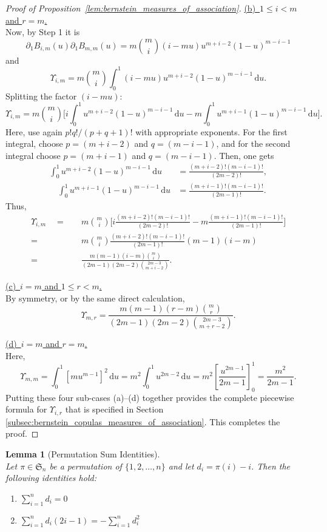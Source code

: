 \documentclass{article}
\newtheorem{lemma}[thm]{Lemma}
\theoremstyle{definition}
\newcommand{\de}{\mathrm{\,d}}
\begin{document}
\begin{proof}[Proof of Proposition~\ref{lem:bernstein_measures_of_association}]
\noindent
\underline{(b)~$1 \le i < m$ and $r = m$.}\\
Now, by Step 1 it is
\[
\partial_1 B_{i,m}(u)\partial_1 B_{m,m}(u)
=m\binom{m}{i}  (i - mu)  u^{m + i -2}  (1-u)^{m-i-1}
\]
and
\[
\Upsilon_{i,m}
=m\binom{m}{i}\int_0^1  \left(i - mu\right)  u^{m + i - 2}  (1-u)^{m-i-1}\de u.
\]
Splitting the factor $(i - mu)$:
\[
\Upsilon_{i,m}
= m\binom{m}{i} \biggl[
  i  \int_0^1    u^{m + i - 2}(1-u)^{m-i-1}  \de u 
  -  m  \int_0^1    u^{m + i - 1}(1-u)^{m-i-1}  \de u
\biggr].
\]
Here, use again $p!q!/(p+q+1)!$ with appropriate exponents.
For the first integral, choose $p = (m + i - 2)$ and $q = (m-i-1)$,  and for the second integral choose $p = (m + i - 1)$ and $q = (m-i-1)$.
Then, one gets
\begin{align*}
    \int_0^1  u^{m + i - 2}(1-u)^{m-i-1}\de u
    &=\frac{(m + i - 2)!(m - i - 1)!}{(2m-2)!}, \\
    \quad\int_0^1  u^{m + i - 1}(1-u)^{m-i-1}\de u
    &=\frac{(m + i - 1)!(m - i - 1)!}{(2m-1)!}.
\end{align*}
Thus,
\begin{align*}
    \Upsilon_{i,m}
    \quad = \quad &m\binom{m}{i}\biggl[  i\frac{(m + i - 2)!(m - i - 1)!}{(2m-2)!} -  m\frac{(m + i - 1)!(m - i - 1)!}{(2m-1)!}\biggr] \\
    = \quad & m\binom{m}{i} \frac{(m + i -2)!(m - i -1)!}{(2m-1)!}(m-1)(i-m) \\
    = \quad & \frac{m(m-1)(i-m)\binom{m}{i}}{(2m-1)(2m-2)\binom{2m-3}{m+i-2}}
.\end{align*}

\smallskip
\noindent
\underline{(c)~$i = m$ and $1 \le r < m$.}\\
By symmetry, or by the same direct calculation,
\[
\Upsilon_{m,r}=\frac{m(m-1)(r-m)\binom{m}{r}}{(2m-1)(2m-2)\binom{2m-3}{m+r-2}}
.\]

\smallskip
\noindent
\underline{(d)~$i = m$ and $r = m$.}\\
Here,
\[
\Upsilon_{m,m}
=\int_0^1  \left[mu^{m-1}\right]^2\de u
=m^2\int_0^1  u^{2m-2}\de u
=m^2\left[\frac{u^{2m-1}}{2m-1}\right]_0^1
=\frac{m^2}{2m-1}.
\]
\medskip
Putting these four sub-cases (a)--(d) together provides the complete piecewise formula for \(\Upsilon_{i,r}\) that is specified in Section \ref{subsec:bernstein_copulas_measures_of_association}.
This completes the proof.
\end{proof}

\begin{lemma}[Permutation Sum Identities]\label{lem:perm_identities}~\\
    Let $\pi \in \mathfrak{S}_n$ be a permutation of $\{1, 2, \dots, n\}$ and let $d_i = \pi(i) - i$. Then the following identities hold:
    \begin{enumerate}[label=(\roman*)]
        \item $\displaystyle \sum_{i=1}^{n} d_i = 0$
        \item $\displaystyle \sum_{i=1}^{n} d_i(2i-1) = -\sum_{i=1}^{n} d_i^{2}$
    \end{enumerate}
\end{lemma}
    
\end{document}
